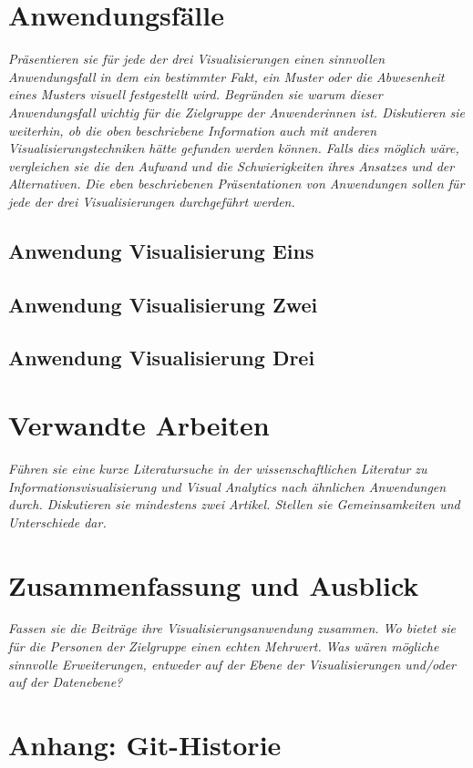 \documentclass[usegeometry=true]{scrartcl}
\begin{document}
\section{Anwendungsfälle}
\textit{Präsentieren sie für jede der drei Visualisierungen einen sinnvollen Anwendungsfall in dem ein bestimmter Fakt, ein Muster oder die Abwesenheit eines Musters visuell festgestellt wird. Begründen sie warum dieser Anwendungsfall wichtig für die Zielgruppe der Anwenderinnen ist. Diskutieren sie weiterhin, ob die oben beschriebene Information auch mit anderen Visualisierungstechniken hätte gefunden werden können. Falls dies möglich wäre, vergleichen sie die den Aufwand und die Schwierigkeiten ihres Ansatzes und der Alternativen. 
}
\textit{Die eben beschriebenen Präsentationen von Anwendungen sollen für jede der drei Visualisierungen durchgeführt werden. 
}

\subsection{Anwendung Visualisierung Eins}
\subsection{Anwendung Visualisierung Zwei}
\subsection{Anwendung Visualisierung Drei}

\section{Verwandte Arbeiten}
\textit{Führen sie eine kurze Literatursuche in der wissenschaftlichen Literatur zu Informationsvisualisierung und Visual Analytics nach ähnlichen Anwendungen durch. Diskutieren sie mindestens zwei Artikel. Stellen sie Gemeinsamkeiten und Unterschiede dar.
}

\section{Zusammenfassung und Ausblick}
\textit{Fassen sie die Beiträge ihre Visualisierungsanwendung zusammen. Wo bietet sie für die Personen der Zielgruppe einen echten Mehrwert.
}
\textit{Was wären mögliche sinnvolle Erweiterungen, entweder auf der Ebene der Visualisierungen und/oder auf der Datenebene?
}    

\section*{Anhang: Git-Historie}

\printbibliography
\end{document}
